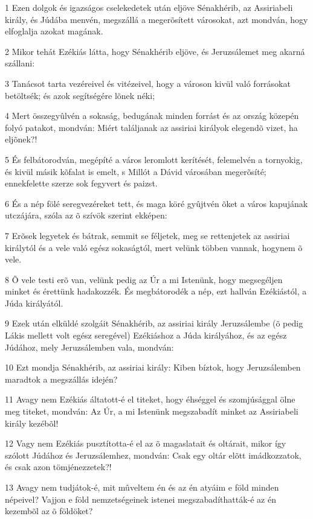 \par 1 Ezen dolgok és igazságos cselekedetek után eljöve Sénakhérib, az Assiriabeli király, és Júdába menvén, megszállá a megerõsített városokat, azt mondván, hogy elfoglalja azokat magának.
\par 2 Mikor tehát Ezékiás látta, hogy Sénakhérib eljöve, és Jeruzsálemet meg akarná szállani:
\par 3 Tanácsot tarta vezéreivel és vitézeivel, hogy a városon kivül való forrásokat betöltsék; és azok segítségére lõnek néki;
\par 4 Mert összegyûlvén a sokaság, bedugának minden forrást és az ország közepén folyó patakot, mondván: Miért találjanak az assiriai királyok elegendõ vizet, ha eljõnek?!
\par 5 És felbátorodván, megépíté a város leromlott kerítését, felemelvén a tornyokig, és kivül másik kõfalat is emelt, s Millót a Dávid városában megerõsíté; ennekfelette szerze sok fegyvert és paizst.
\par 6 És a nép fölé seregvezéreket tett, és maga köré gyûjtvén õket a város kapujának utczájára, szóla az õ szívök szerint ekképen:
\par 7 Erõsek legyetek és bátrak, semmit se féljetek, meg se rettenjetek az assiriai királytól és a vele való egész sokaságtól, mert velünk többen vannak, hogynem õ vele.
\par 8 Õ vele testi erõ van, velünk pedig az Úr a mi Istenünk, hogy megsegéljen minket és érettünk hadakozzék. És megbátorodék a nép, ezt hallván Ezékiástól, a Júda királyától.
\par 9 Ezek után elküldé szolgáit Sénakhérib, az assiriai király Jeruzsálembe (õ pedig Lákis mellett volt egész seregével) Ezékiáshoz a Júda királyához, és az egész Júdához, mely Jeruzsálemben vala, mondván:
\par 10 Ezt mondja Sénakhérib, az assiriai király: Kiben bíztok, hogy Jeruzsálemben maradtok a megszállás idején?
\par 11 Avagy nem Ezékiás áltatott-é el titeket, hogy éhséggel és szomjúsággal ölne meg titeket, mondván: Az Úr, a mi Istenünk megszabadít minket az Assiriabeli király kezébõl!
\par 12 Vagy nem Ezékiás pusztította-é el az õ magaslatait és oltárait, mikor így szólott Júdához és Jeruzsálemhez, mondván: Csak egy oltár elõtt imádkozzatok, és csak azon tömjénezzetek?!
\par 13 Avagy nem tudjátok-é, mit mûveltem én és az én atyáim e föld minden népeivel? Vajjon e föld nemzetségeinek istenei megszabadíthatták-é az én kezembõl az õ földöket?
